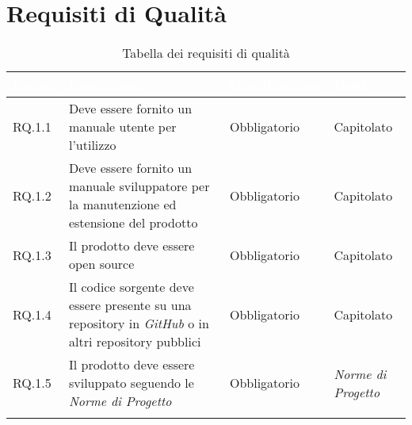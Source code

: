 \section{Requisiti di Qualità}
\begin{center}
  \centering
  \begin{longtable}{|L{1,5cm}|C{5,5cm}|C{3cm}|C{2cm}|}
    \hline
    \textcolor[HTML]{FFFFFF}{\textbf{Codice}} & \textcolor[HTML]{FFFFFF}{\textbf{Descrizione}} & \textcolor[HTML]{FFFFFF}{\textbf{Classificazione}} & \textcolor[HTML]{FFFFFF}{\textbf{Fonti}}
    \\ \hline
    RQ.1.1 & Deve essere fornito un manuale utente per l'utilizzo & Obbligatorio & Capitolato \\ \hline
    RQ.1.2 & Deve essere fornito un manuale sviluppatore per la manutenzione ed estensione del prodotto & Obbligatorio & Capitolato \\ \hline
    RQ.1.3 & Il prodotto deve essere open source & Obbligatorio & Capitolato \\ \hline
    RQ.1.4 & Il codice sorgente deve essere presente su una repository in \textit{GitHub} o in altri repository pubblici & Obbligatorio & Capitolato \\ \hline
    RQ.1.5 & Il prodotto deve essere sviluppato seguendo le \textit{Norme di Progetto} & Obbligatorio & \textit{Norme di Progetto} \\ \hline

    \caption{Tabella dei requisiti di qualità}
  \end{longtable}
\end{center}

